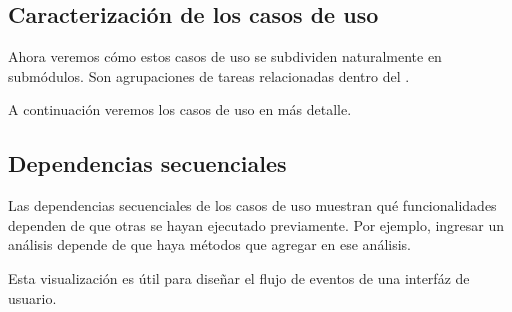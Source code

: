 \documentclass[letterpaper,10pt,spanish]{sphinxmanual}
\begin{document}
\subsection{Caracterización de los casos de uso}
\label{\detokenize{requerimientos/srs:caracterizacion-de-los-casos-de-uso}}
Ahora veremos cómo estos casos de uso se subdividen naturalmente en
submódulos. Son agrupaciones de tareas relacionadas dentro del
.

A continuación veremos los casos de uso en más detalle.








\subsection{Dependencias secuenciales}
\label{\detokenize{requerimientos/srs:dependencias-secuenciales}}
Las dependencias secuenciales de los casos de
uso muestran qué funcionalidades dependen de que otras se hayan
ejecutado previamente. Por ejemplo, ingresar un análisis depende de que
haya métodos que agregar en ese análisis.

Esta visualización es útil para diseñar el flujo de eventos de una
interfáz de usuario.

\end{document}
